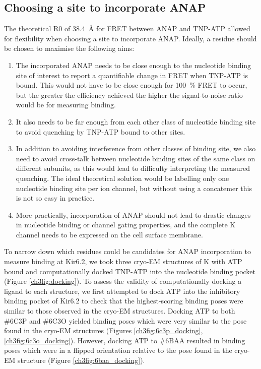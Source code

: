 \subsection{Choosing a site to incorporate ANAP}

The theoretical R0 of \SI{38.4}{\angstrom} for FRET between ANAP and TNP-ATP allowed for flexibility when choosing a site to incorporate ANAP.
Ideally, a residue should be chosen to maximise the following aims:

\begin{enumerate}
	\item The incorporated ANAP needs to be close enough to the nucleotide binding site of interest to report a quantifiable change in FRET when TNP-ATP is bound.
	This would not have to be close enough for \SI{100}{\percent} FRET to occur, but the greater the efficiency achieved the higher the signal-to-noise ratio would be for measuring binding.
	\item It also needs to be far enough from each other class of nucleotide binding site to avoid quenching by TNP-ATP bound to other sites.
	\item In addition to avoiding interference from other classes of binding site, we also need to avoid cross-talk between nucleotide binding sites of the same class on different subunits, as this would lead to difficulty interpreting the measured quenching.
	The ideal theoretical solution would be labelling only one nucleotide binding site per ion channel, but without using a concatemer this is not so easy in practice.
	\item More practically, incorporation of ANAP should not lead to drastic changes in nucleotide binding or channel gating properties, and the complete K\ATP{} channel needs to be expressed on the cell surface membrane.
\end{enumerate}

To narrow down which residues could be candidates for ANAP incorporation to measure binding at Kir6.2, we took three cryo-EM structures of K\ATP{} with ATP bound and computationally docked TNP-ATP into the nucleotide binding pocket (Figure \ref{ch3fig:docking}).
To assess the validity of computationally docking a ligand to each structure, we first attempted to dock ATP into the inhibitory binding pocket of Kir6.2 to check that the highest-scoring binding poses were similar to those observed in the cryo-EM structures.
Docking ATP to both \#6C3P and \#6C3O yielded binding poses which were very similar to the pose found in the cryo-EM structures (Figures \ref{ch3fig:6c3p_docking}, \ref{ch3fig:6c3o_docking}).
However, docking ATP to \#6BAA resulted in binding poses which were in a flipped orientation relative to the pose found in the cryo-EM structure (Figure \ref{ch3fig:6baa_docking}).

